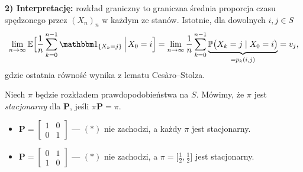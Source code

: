 \documentclass[dvipsnames]{book}
\begin{document}
\textbf{2) Interpretację:} rozkład graniczny to graniczna średnia proporcja
czasu spędzonego przez $(X_n)_n$ w każdym ze stanów. Istotnie, dla dowolnych
$i,j \in S$
\[
  \lim_{n \to \infty}
    \E\Big[\frac1n \sum_{k=0}^{n-1} \ind_{\{X_k = j\}} \,\Big|\, X_0 = i\Big]
  = \lim_{n \to \infty} \frac1n \sum_{k=0}^{n-1}
    \underbrace{\P\big(X_k = j \mid X_0 = i\big)}_{= p_k(i,j)}
  = v_j,
\]
gdzie ostatnia równość wynika z lematu Cesàro--Stolza.

\begin{definicja}
Niech $\pi$ będzie rozkładem prawdopodobieństwa na $S$. Mówimy, że $\pi$ jest
\emph{stacjonarny} dla $\mathbf{P}$, jeśli $\pi \mathbf{P} = \pi$.
\end{definicja}

\begin{przyklad}
\begin{itemize}[topsep=0pt,itemsep=0pt]
  \item $\mathbf{P} = \begin{bmatrix} 1 & 0 \\ 0 & 1 \end{bmatrix}$ ---
  $(*)$ nie zachodzi, a każdy $\pi$ jest stacjonarny.
  \item $\mathbf{P} = \begin{bmatrix} 0 & 1 \\ 1 & 0 \end{bmatrix}$ ---
  $(*)$ nie zachodzi, a $\pi = \big[\tfrac12, \tfrac12\big]$ jest stacjonarny.
\end{itemize}
\end{przyklad}
\end{document}
